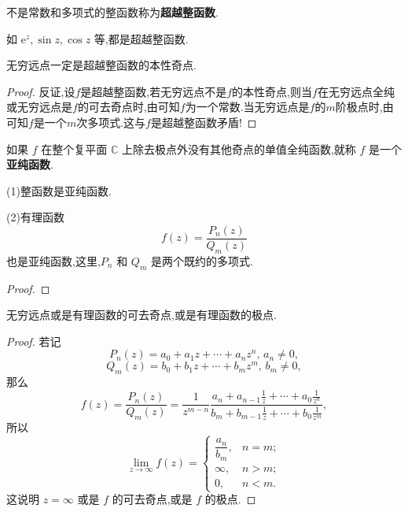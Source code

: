\documentclass[../../main.tex]{subfiles}%
\begin{document}
\begin{definition}
不是常数和多项式的整函数称为\textbf{超越整函数}.
\end{definition}
\begin{remark}
如 \( \mathrm{e}^z,\sin z,\cos z \) 等,都是超越整函数.
\end{remark}

\begin{proposition}
无穷远点一定是超越整函数的本性奇点.
\end{proposition}
\begin{proof}
反证,设$f$是超越整函数,若无穷远点不是$f$的本性奇点,则当$f$在无穷远点全纯或无穷远点是$f$的可去奇点时,由可知$f$为一个常数.当无穷远点是$f$的$m$阶极点时,由可知$f$是一个$m$次多项式.这与$f$是超越整函数矛盾!
\end{proof}


\begin{definition}
如果 \( f \) 在整个复平面 \( \mathbb{C} \) 上除去极点外没有其他奇点的单值全纯函数,就称 \( f \) 是一个\textbf{亚纯函数}.
\end{definition}

\begin{proposition}
(1)整函数是亚纯函数.

(2)有理函数
\[
f(z) = \frac{P_n(z)}{Q_m(z)}
\]
也是亚纯函数,这里,\( P_n \) 和 \( Q_m \) 是两个既约的多项式.
\end{proposition}
\begin{proof}

\end{proof}

\begin{proposition}
无穷远点或是有理函数的可去奇点,或是有理函数的极点.
\end{proposition}
\begin{proof}
若记
\[
P_n(z) = a_0 + a_1 z + \cdots + a_n z^n, \, a_n \neq 0,
\]
\[
Q_m(z) = b_0 + b_1 z + \cdots + b_m z^m, \, b_m \neq 0,
\]
那么
\[
f(z) = \frac{P_n(z)}{Q_m(z)} = \frac{1}{z^{m - n}} \frac{a_n + a_{n - 1} \frac{1}{z} + \cdots + a_0 \frac{1}{z^n}}{b_m + b_{m - 1} \frac{1}{z} + \cdots + b_0 \frac{1}{z^m}},
\]
所以
\[
\lim_{z \to \infty} f(z) = \begin{cases} 
\dfrac{a_n}{b_m}, & n = m; \\
\infty, & n > m; \\
0, & n < m.
\end{cases}
\]
这说明 \( z = \infty \) 或是 \( f \) 的可去奇点,或是 \( f \) 的极点.
\end{proof}
\end{document}
